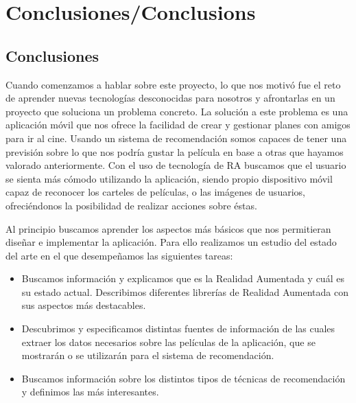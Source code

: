 
\cleardoublepage


\chapter{Conclusiones/Conclusions}
\label{makereference5}

\section{Conclusiones}
\label{makereference5.1}
Cuando comenzamos a hablar sobre este proyecto, lo que nos motivó fue el
 reto de aprender nuevas tecnologías desconocidas para nosotros y afrontarlas
 en un proyecto que soluciona un problema concreto. La solución a este problema
 es una aplicación móvil que nos ofrece la facilidad de crear y gestionar
 planes con amigos para ir al cine. Usando un sistema de recomendación somos
 capaces de tener una previsión sobre lo que nos podría gustar la película en
 base a otras que hayamos valorado anteriormente.
 Con el uso de tecnología de RA buscamos que el usuario se sienta más cómodo
 utilizando la aplicación, siendo 
 propio dispositivo móvil capaz de reconocer los carteles de películas, o las
 imágenes de usuarios, ofreciéndonos la posibilidad de realizar acciones sobre éstas.

Al principio buscamos aprender los aspectos más básicos que nos permitieran
 diseñar e implementar la aplicación. Para ello realizamos un estudio
 del estado del arte en el que desempeñamos las siguientes tareas:
\begin{itemize}  
    \item Buscamos información y explicamos que es la Realidad Aumentada y cuál
     es su estado actual. Describimos diferentes librerías de Realidad Aumentada
     con sus aspectos más destacables.
    \item Descubrimos y especificamos distintas fuentes de información de las
     cuales extraer los datos necesarios sobre las películas de la aplicación,
     que se mostrarán o se utilizarán para el sistema de recomendación.
    \item Buscamos información sobre los distintos tipos de técnicas de
     recomendación y definimos las más interesantes.
\end{itemize}

